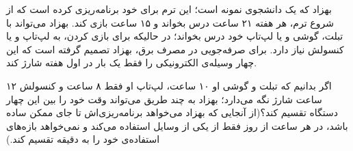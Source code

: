     بهزاد که یک دانشجوی نمونه است؛ این ترم برای خود برنامه‌ریزی کرده است که از شروع ترم، هر هفته ۲۱ ساعت درس بخواند و ۱۵ ساعت بازی کند. بهزاد می‌تواند با تبلت، گوشی و یا لپ‌تاپ خود درس بخواند؛ در حالیکه برای بازی کردن، به لپ‌تاپ و یا کنسولش نیاز دارد. برای صرفه‌جویی در مصرف برق، بهزاد تصمیم گرفته است که این چهار وسیله‌ی الکترونیکی را فقط یک بار در اول هفته شارژ کند.
    
    اگر بدانیم که تبلت و گوشی او ۱۰ ساعت، لپ‌تاپ او فقط ۸ ساعت و کنسولش ۱۲ ساعت شارژ نگه می‌دارد؛ بهزاد به چند طریق می‌تواند وقت خود را بین این چهار دستگاه تقسیم کند؟(از آنجایی که بهزاد می‌خواهد برنامه‌ریزی‌اش تا جای
ممکن ساده باشد، در هر ساعت از روز فقط از یکی از وسایل استفاده می‌کند و نمی‌خواهد بازه‌های استفاده‌ی خود را به دقیقه تقسیم کند.)
